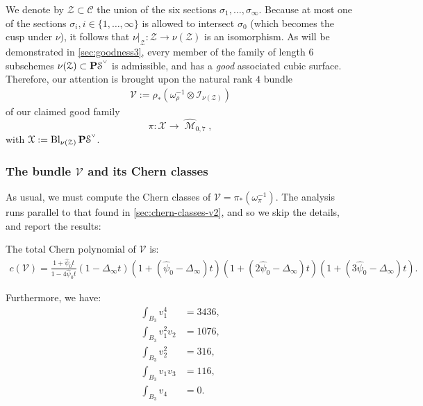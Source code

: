 \documentclass[12pt,reqno]{amsart}
\DeclareMathOperator{\Bl}{Bl}
\DeclareMathOperator{\M}{\mathcal{M}}
\renewcommand{\to}{{\longrightarrow}}
\numberwithin{equation}{section}
\newcommand{\V}{\mathcal V}
\newcommand{\cC}{\mathcal{C}}
\newcommand{\cX}{\mathcal{X}}
\newcommand{\hpsi}{\widehat{\psi}}
\newcommand{\smvee}{\raise0.5ex\hbox{$\scriptscriptstyle\vee$}}
\newcommand{\hM}{\widehat{\M}}
\begin{document}
  We denote by $\mathcal{Z} \subset \cC$ the union of the six sections
  $\sigma_{1}, \dots, \sigma_{\infty}$.  Because at most one of the
  sections $\sigma_{i}, i \in \{1, \dots, \infty\}$ is allowed to
  intersect $\sigma_{0}$ (which becomes the cusp under $\nu$), it
  follows that $\nu|_{\mathcal{Z}}:\mathcal{Z} \to \nu(\mathcal{Z})$
  is an isomorphism. As will be demonstrated in
  \autoref{sec:goodness3}, every member of the family of length $6$
  subschemes $\nu(\mathcal{Z}) \subset \P \mathcal{S}^{\smvee}$ is
  admissible, and has a {\sl good} associated cubic surface.
  Therefore, our attention is brought upon the natural rank $4$ bundle
  \begin{align}
    \label{eq:V3}
    \V := \rho_{*}\left(\omega_{\rho}^{-1} \otimes \mathcal{I}_{\nu(\mathcal{Z})}\right)
  \end{align}
  of our claimed good family $$\pi: \cX \to \hM_{0,7},$$ with
  $\cX := \Bl_{\nu(\mathcal{Z})}\P \mathcal{S}^{\smvee}$.


\subsubsection{The bundle $\V$ and its Chern classes}
\label{sec:bundle-v3}

As usual, we must compute the Chern classes of
$\V = \pi_{*}\left( \omega_{\pi}^{-1} \right)$.  The analysis runs
parallel to that found in \autoref{sec:chern-classes-v2}, and so we
skip the details, and report the results:

\begin{proposition}
  \label{prop:chernV3} The total Chern polynomial of $\V$ is:
  \begin{align}
    \label{eq:chernV3}
    c(\V) = \frac{1+\hpsi_{0}t}{1-4 \hpsi_{0}t}\left(1-\Delta_{\infty}t \right) \left(1 + (\hpsi_{0}-\Delta_{\infty})t \right)  \left(1 + (2\hpsi_{0}-\Delta_{\infty})t \right) \left(1 + (3\hpsi_{0}-\Delta_{\infty})t \right).
  \end{align}

  Furthermore, we have:
  \begin{align}
    \label{eq:monomialsV3}
    \int_{B_{3}}v_{1}^{4}& = 3436, \\ \nonumber
    \int_{B_{3}} v_{1}^{2}v_{2}& = 1076,\\ \nonumber
    \int_{B_{3}} v_{2}^{2}& = 316, \\ \nonumber
    \int_{B_{3}} v_{1}v_{3}& = 116, \\ \nonumber
    \int_{B_{3}} v_{4}& = 0. \nonumber
  \end{align}
\end{proposition}
\end{document}
